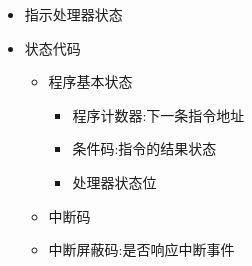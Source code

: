\documentclass[a4paper,12pt,notitlepage]{article}
\begin{document}
\begin{itemize}
	\begin{itemize}
		\item 指示处理器状态
		\item 状态代码
		\begin{itemize}
			\item 程序基本状态
			\begin{itemize}
				\item 程序计数器:下一条指令地址
				\item 条件码:指令的结果状态
				\item 处理器状态位
			\end{itemize}
			\item 中断码
			\item 中断屏蔽码:是否响应中断事件
		\end{itemize}
	\end{itemize}
\end{itemize}
\end{document}
